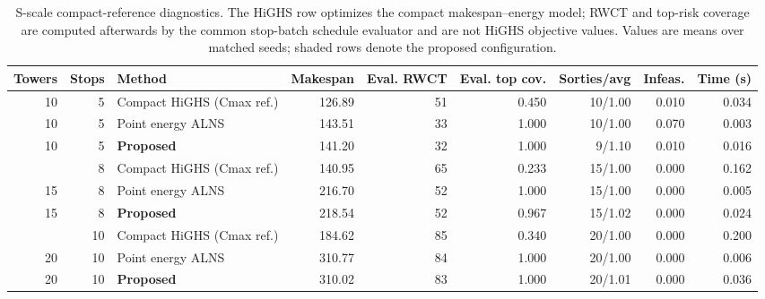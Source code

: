 \begin{table}[H]
\centering
\caption{S-scale compact-reference diagnostics. The HiGHS row optimizes the compact makespan--energy model; RWCT and top-risk coverage are computed afterwards by the common stop-batch schedule evaluator and are not HiGHS objective values. Values are means over matched seeds; shaded rows denote the proposed configuration.}
\label{tab:small-reference}
\small
\setlength{\tabcolsep}{3.0pt}
\begin{tabular*}{\textwidth}{@{\extracolsep{\fill}}rrlrrrrrr@{}}
\toprule
Towers & Stops & Method & Makespan & Eval. RWCT & Eval. top cov. & Sorties/avg & Infeas. & Time (s) \\
\midrule
10 & 5 & Compact HiGHS (Cmax ref.) & 126.89 & 51 & 0.450 & 10/1.00 & 0.010 & 0.034 \\
10 & 5 & Point energy ALNS & 143.51 & 33 & 1.000 & 10/1.00 & 0.070 & 0.003 \\
\rowcolor{gray!10}
10 & 5 & \textbf{Proposed} & 141.20 & 32 & 1.000 & 9/1.10 & 0.010 & 0.016 \\
\addlinespace[2pt]
15 & 8 & Compact HiGHS (Cmax ref.) & 140.95 & 65 & 0.233 & 15/1.00 & 0.000 & 0.162 \\
15 & 8 & Point energy ALNS & 216.70 & 52 & 1.000 & 15/1.00 & 0.000 & 0.005 \\
\rowcolor{gray!10}
15 & 8 & \textbf{Proposed} & 218.54 & 52 & 0.967 & 15/1.02 & 0.000 & 0.024 \\
\addlinespace[2pt]
20 & 10 & Compact HiGHS (Cmax ref.) & 184.62 & 85 & 0.340 & 20/1.00 & 0.000 & 0.200 \\
20 & 10 & Point energy ALNS & 310.77 & 84 & 1.000 & 20/1.00 & 0.000 & 0.006 \\
\rowcolor{gray!10}
20 & 10 & \textbf{Proposed} & 310.02 & 83 & 1.000 & 20/1.01 & 0.000 & 0.036 \\
\bottomrule
\end{tabular*}
\end{table}
